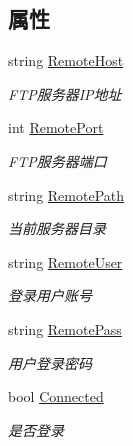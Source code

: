 \subsection*{属性}
\begin{DoxyCompactItemize}
\item 
string \hyperlink{class_x_c_l_net_tools_1_1_f_t_p_1_1_f_t_p_client_a020891b3ab32deba2b8e2b2204349f1d}{Remote\+Host}
\begin{DoxyCompactList}\small\item\em F\+T\+P服务器\+I\+P地址 \end{DoxyCompactList}\item 
int \hyperlink{class_x_c_l_net_tools_1_1_f_t_p_1_1_f_t_p_client_af47bf07406237f3bd179472debf9c84d}{Remote\+Port}
\begin{DoxyCompactList}\small\item\em F\+T\+P服务器端口 \end{DoxyCompactList}\item 
string \hyperlink{class_x_c_l_net_tools_1_1_f_t_p_1_1_f_t_p_client_a6dd534c17624097f4c29442ce3e5a176}{Remote\+Path}
\begin{DoxyCompactList}\small\item\em 当前服务器目录 \end{DoxyCompactList}\item 
string \hyperlink{class_x_c_l_net_tools_1_1_f_t_p_1_1_f_t_p_client_ab97c698dca9a54f44b1e69cb15c1126d}{Remote\+User}
\begin{DoxyCompactList}\small\item\em 登录用户账号 \end{DoxyCompactList}\item 
string \hyperlink{class_x_c_l_net_tools_1_1_f_t_p_1_1_f_t_p_client_a89a0c18691dfde35bdb46696a0344bff}{Remote\+Pass}
\begin{DoxyCompactList}\small\item\em 用户登录密码 \end{DoxyCompactList}\item 
bool \hyperlink{class_x_c_l_net_tools_1_1_f_t_p_1_1_f_t_p_client_af3e0775ddf1dc1530b82b5b0a6aa4d25}{Connected}
\begin{DoxyCompactList}\small\item\em 是否登录 \end{DoxyCompactList}\end{DoxyCompactItemize}


